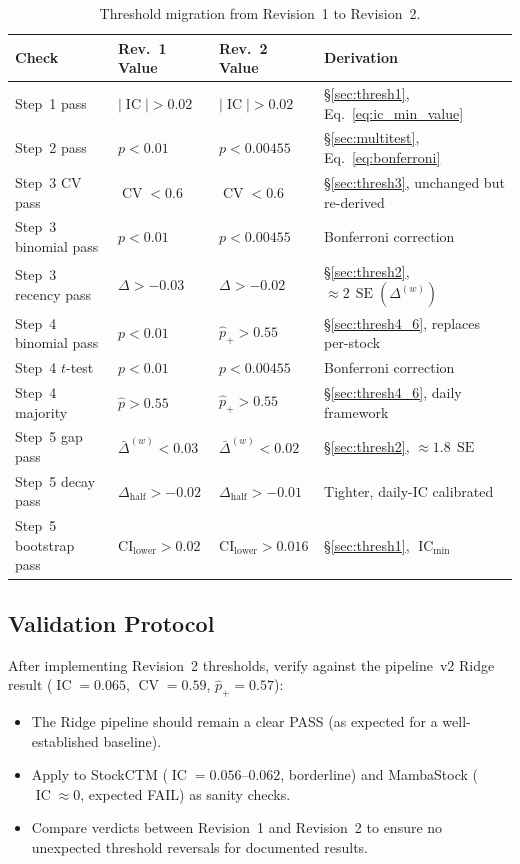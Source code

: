 \documentclass[11pt,a4paper]{article}
\theoremstyle{definition}
\newcommand{\IC}{\operatorname{IC}}
\newcommand{\SE}{\operatorname{SE}}
\newcommand{\CV}{\operatorname{CV}}
\begin{document}
\begin{table}[htbp]
\centering
\caption{Threshold migration from Revision~1 to Revision~2.}
\label{tab:migration}
\small
\begin{tabular}{llll}
\toprule
Check & Rev.~1 Value & Rev.~2 Value & Derivation \\
\midrule
Step~1 pass            & $|\IC| > 0.02$ & $|\IC| > 0.02$ & \S\ref{sec:thresh1}, Eq.~\eqref{eq:ic_min_value} \\
Step~2 pass            & $p < 0.01$ & $p < 0.00455$ & \S\ref{sec:multitest}, Eq.~\eqref{eq:bonferroni} \\
Step~3 CV pass         & $\CV < 0.6$ & $\CV < 0.6$ & \S\ref{sec:thresh3}, unchanged but re-derived \\
Step~3 binomial pass   & $p < 0.01$ & $p < 0.00455$ & Bonferroni correction \\
Step~3 recency pass    & $\Delta > -0.03$ & $\Delta > -0.02$ & \S\ref{sec:thresh2}, $\approx 2\,\SE(\Delta^{(w)})$ \\
Step~4 binomial pass   & $p < 0.01$ & $\hat{p}_{+} > 0.55$ & \S\ref{sec:thresh4_6}, replaces per-stock \\
Step~4 $t$-test        & $p < 0.01$ & $p < 0.00455$ & Bonferroni correction \\
Step~4 majority        & $\hat{p} > 0.55$ & $\hat{p}_{+} > 0.55$ & \S\ref{sec:thresh4_6}, daily framework \\
Step~5 gap pass        & $\bar{\Delta}^{(w)} < 0.03$ & $\bar{\Delta}^{(w)} < 0.02$ & \S\ref{sec:thresh2}, $\approx 1.8\,\SE$ \\
Step~5 decay pass      & $\Delta_{\text{half}} > -0.02$ & $\Delta_{\text{half}} > -0.01$ & Tighter, daily-IC calibrated \\
Step~5 bootstrap pass  & $\text{CI}_{\text{lower}} > 0.02$ & $\text{CI}_{\text{lower}} > 0.016$ & \S\ref{sec:thresh1}, $\IC_{\min}$ \\
\bottomrule
\end{tabular}
\end{table}

\subsection{Validation Protocol}

After implementing Revision~2 thresholds, verify against the pipeline~v2
Ridge result ($\IC=0.065$, $\CV=0.59$, $\hat{p}_{+}=0.57$):
\begin{itemize}[nosep]
    \item The Ridge pipeline should remain a clear PASS (as expected
          for a well-established baseline).
    \item Apply to StockCTM ($\IC=0.056$--$0.062$, borderline) and
          MambaStock ($\IC \approx 0$, expected FAIL) as sanity checks.
    \item Compare verdicts between Revision~1 and Revision~2 to ensure
          no unexpected threshold reversals for documented results.
\end{itemize}
\end{document}
